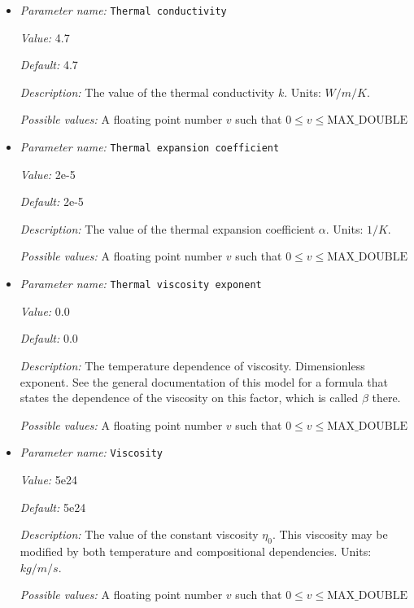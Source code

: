 \begin{itemize}
{\it Default:} 293


{\it Description:} The reference temperature $T_0$. The reference temperature is used in both the density and viscosity formulas. Units: $K$.


{\it Possible values:} A floating point number $v$ such that $0 \leq v \leq \text{MAX\_DOUBLE}$
\item {\it Parameter name:} {\tt Thermal conductivity}
\label{parameters:Material model/Simple model/Thermal conductivity}


{\it Value:} 4.7


{\it Default:} 4.7


{\it Description:} The value of the thermal conductivity $k$. Units: $W/m/K$.


{\it Possible values:} A floating point number $v$ such that $0 \leq v \leq \text{MAX\_DOUBLE}$
\item {\it Parameter name:} {\tt Thermal expansion coefficient}
\label{parameters:Material model/Simple model/Thermal expansion coefficient}


{\it Value:} 2e-5


{\it Default:} 2e-5


{\it Description:} The value of the thermal expansion coefficient $\alpha$. Units: $1/K$.


{\it Possible values:} A floating point number $v$ such that $0 \leq v \leq \text{MAX\_DOUBLE}$
\item {\it Parameter name:} {\tt Thermal viscosity exponent}
\label{parameters:Material model/Simple model/Thermal viscosity exponent}


{\it Value:} 0.0


{\it Default:} 0.0


{\it Description:} The temperature dependence of viscosity. Dimensionless exponent. See the general documentation of this model for a formula that states the dependence of the viscosity on this factor, which is called $\beta$ there.


{\it Possible values:} A floating point number $v$ such that $0 \leq v \leq \text{MAX\_DOUBLE}$
\item {\it Parameter name:} {\tt Viscosity}
\label{parameters:Material model/Simple model/Viscosity}


{\it Value:} 5e24


{\it Default:} 5e24


{\it Description:} The value of the constant viscosity $\eta_0$. This viscosity may be modified by both temperature and compositional dependencies. Units: $kg/m/s$.


{\it Possible values:} A floating point number $v$ such that $0 \leq v \leq \text{MAX\_DOUBLE}$
\end{itemize}

